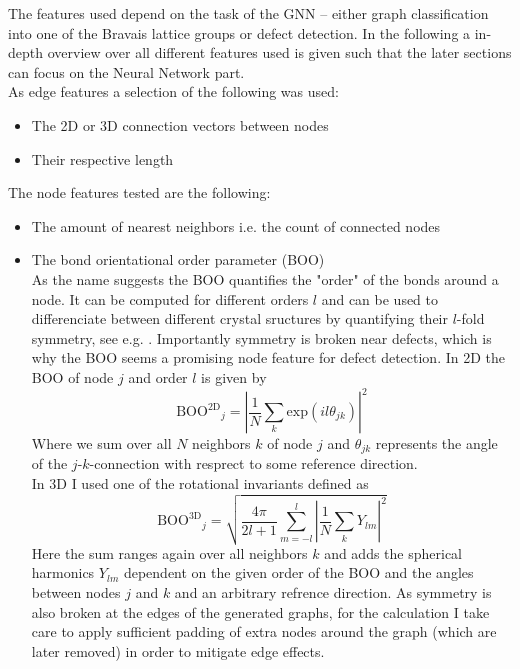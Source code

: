 \documentclass[11pt,a4paper]{article}
\begin{document}
The features used depend on the task of the GNN -- either graph classification into one of the Bravais lattice groups or defect detection. 
In the following a in-depth overview over all different features used is given such that the later sections can focus on the Neural Network part. \\
As edge features a selection of the following was used: 
\begin{itemize}
    \item The 2D or 3D connection vectors between nodes
    \item Their respective length
\end{itemize}
The node features tested are the following:
\begin{itemize}
    \item The amount of nearest neighbors i.e. the count of connected nodes
    \item The bond orientational order parameter (BOO)\\
    As the name suggests the BOO quantifies the "order" of the bonds around a node. 
    It can be computed for different orders $l$ and can be used to differenciate between different crystal sructures by quantifying their $l$-fold symmetry, see e.g. \cite{steinhardtBondorientationalOrderLiquids1983}. 
    Importantly symmetry is broken near defects, which is why the BOO seems a promising node feature for defect detection. 
    In 2D the BOO of node $j$ and order $l$ is given by
    \begin{equation}
        \mathrm{BOO^{2D}}_j = \left|\frac{1}{N} \sum_k \mathrm{exp}(il\theta_{jk}) \right|^2
    \end{equation}
    Where we sum over all $N$ neighbors $k$ of node $j$ and $\theta_{jk}$ represents the angle of the $j$-$k$-connection with resprect to some reference direction. \\
    In 3D I used one of the rotational invariants defined as 
    \begin{equation}
        \mathrm{BOO^{3D}}_j = \sqrt{\frac{4\pi}{2l+1} \sum_{m=-l}^{l} \left| \frac{1}{N} \sum_k Y_{lm}\right|^2}
    \end{equation} 
    Here the sum ranges again over all neighbors $k$ and adds the spherical harmonics $Y_{lm}$ dependent on the given order of the BOO and the angles between nodes $j$ and $k$ and an arbitrary refrence direction. 
    As symmetry is also broken at the edges of the generated graphs, for the calculation I take care to apply sufficient padding of extra nodes around the graph (which are later removed) in order to mitigate edge effects. 
\end{itemize}
\end{document}
